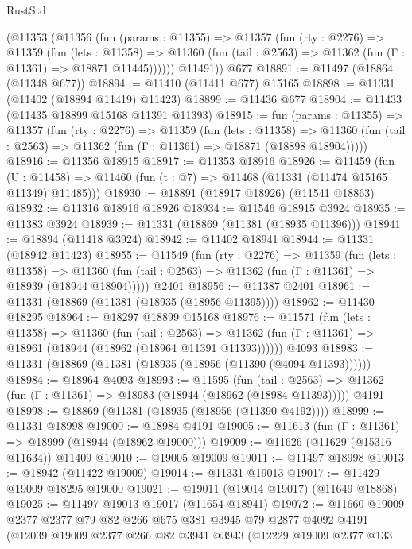 \begin{lexlean}{RustStd}
\begin{coremodule}
      (@11353
        (@11356
          (fun (params : @11355) =>
          @11357
            (fun (rty : @2276) =>
            @11359
              (fun (lets : @11358) =>
              @11360 (fun (tail : @2563) => @11362 (fun (Γ : @11361) => @18871 @11445))))))
        @11491))
    @677
@18891 := @11497 (@18864 (@11348 @677))
@18894 := @11410 (@11411 @677) @15165
@18898 := @11331 (@11402 (@18894 @11419) @11423)
@18899 := @11436 @677
@18904 := @11433 (@11435 @18899 @15168 @11391 @11393)
@18915 := fun (params : @11355) =>
  @11357
    (fun (rty : @2276) =>
    @11359
      (fun (lets : @11358) =>
      @11360 (fun (tail : @2563) => @11362 (fun (Γ : @11361) => @18871 (@18898 @18904)))))
@18916 := @11356 @18915
@18917 := @11353 @18916
@18926 := @11459
    (fun (U : @11458) => @11460 (fun (t : @7) => @11468 (@11331 (@11474 @15165 @11349) @11485)))
@18930 := @18891 (@18917 @18926) (@11541 @18863)
@18932 := @11316 @18916 @18926
@18934 := @11546 @18915 @3924
@18935 := @11383 @3924
@18939 := @11331 (@18869 (@11381 (@18935 @11396)))
@18941 := @18894 (@11418 @3924)
@18942 := @11402 @18941
@18944 := @11331 (@18942 @11423)
@18955 := @11549
    (fun (rty : @2276) =>
    @11359
      (fun (lets : @11358) =>
      @11360 (fun (tail : @2563) => @11362 (fun (Γ : @11361) => @18939 (@18944 @18904)))))
    @2401
@18956 := @11387 @2401
@18961 := @11331 (@18869 (@11381 (@18935 (@18956 @11395))))
@18962 := @11430 @18295
@18964 := @18297 @18899 @15168
@18976 := @11571
    (fun (lets : @11358) =>
    @11360
      (fun (tail : @2563) =>
      @11362 (fun (Γ : @11361) => @18961 (@18944 (@18962 (@18964 @11391 @11393))))))
    @4093
@18983 := @11331 (@18869 (@11381 (@18935 (@18956 (@11390 (@4094 @11393))))))
@18984 := @18964 @4093
@18993 := @11595
    (fun (tail : @2563) => @11362 (fun (Γ : @11361) => @18983 (@18944 (@18962 (@18984 @11393)))))
    @4191
@18998 := @18869 (@11381 (@18935 (@18956 (@11390 @4192))))
@18999 := @11331 @18998
@19000 := @18984 @4191
@19005 := @11613 (fun (Γ : @11361) => @18999 (@18944 (@18962 @19000)))
@19009 := @11626 (@11629 (@15316 @11634)) @11409
@19010 := @19005 @19009
@19011 := @11497 @18998
@19013 := @18942 (@11422 @19009)
@19014 := @11331 @19013
@19017 := @11429 @19009 @18295 @19000
@19021 := @19011 (@19014 @19017) (@11649 @18868)
@19025 := @11497 @19013 @19017 (@11654 @18941)
@19072 := @11660
    @19009
    @2377
    @2377
    @79
    @82
    @266
    @675
    @381
    @3945
    @79
    @2877
    @4092
    @4191
    (@12039
      @19009
      @2377
      @266
      @82
      @3941
      @3943
      (@12229
        @19009
        @2377
        @133

\end{coremodule}
\end{lexlean}
